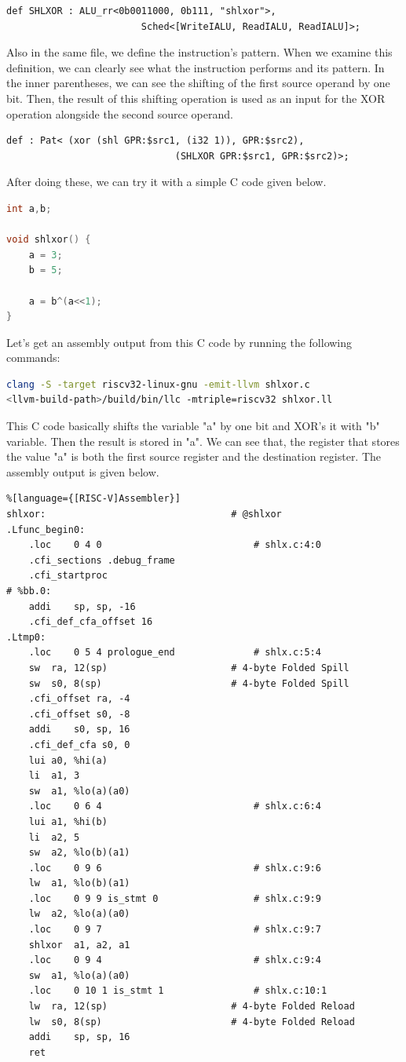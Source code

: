 \begin{lstlisting}
def SHLXOR : ALU_rr<0b0011000, 0b111, "shlxor">,
                        Sched<[WriteIALU, ReadIALU, ReadIALU]>;
\end{lstlisting}

Also in the same file, we define the instruction’s pattern. When we examine this definition, we can clearly see what the instruction performs and its pattern. In the inner parentheses, we can see the shifting of the first source operand by one bit. Then, the result of this shifting operation is used as an input for the XOR operation alongside the second source operand.

\begin{lstlisting}
def : Pat< (xor (shl GPR:$src1, (i32 1)), GPR:$src2),
                              (SHLXOR GPR:$src1, GPR:$src2)>;
\end{lstlisting}

After doing these, we can try it with a simple C code given below. 

\begin{lstlisting}[language=C++]
int a,b;

void shlxor() {
	a = 3;
	b = 5;
		
	a = b^(a<<1);
}
\end{lstlisting}

Let’s get an assembly output from this C code by running the following commands:

\begin{lstlisting}[language=Bash]
clang -S -target riscv32-linux-gnu -emit-llvm shlxor.c
<llvm-build-path>/build/bin/llc -mtriple=riscv32 shlxor.ll
\end{lstlisting}


This C code basically shifts the variable "a" by one bit and XOR’s it with "b" variable. Then the result is stored in "a". We can see that, the register that stores the value "a" is both the first source register and the destination register. The assembly output is given below.
\begin{lstlisting}%[language={[RISC-V]Assembler}]
shlxor:                                 # @shlxor
.Lfunc_begin0:
	.loc	0 4 0                           # shlx.c:4:0
	.cfi_sections .debug_frame
	.cfi_startproc
# %bb.0:
	addi	sp, sp, -16
	.cfi_def_cfa_offset 16
.Ltmp0:
	.loc	0 5 4 prologue_end              # shlx.c:5:4
	sw	ra, 12(sp)                      # 4-byte Folded Spill
	sw	s0, 8(sp)                       # 4-byte Folded Spill
	.cfi_offset ra, -4
	.cfi_offset s0, -8
	addi	s0, sp, 16
	.cfi_def_cfa s0, 0
	lui	a0, %hi(a)
	li	a1, 3
	sw	a1, %lo(a)(a0)
	.loc	0 6 4                           # shlx.c:6:4
	lui	a1, %hi(b)
	li	a2, 5
	sw	a2, %lo(b)(a1)
	.loc	0 9 6                           # shlx.c:9:6
	lw	a1, %lo(b)(a1)
	.loc	0 9 9 is_stmt 0                 # shlx.c:9:9
	lw	a2, %lo(a)(a0)
	.loc	0 9 7                           # shlx.c:9:7
	shlxor	a1, a2, a1
	.loc	0 9 4                           # shlx.c:9:4
	sw	a1, %lo(a)(a0)
	.loc	0 10 1 is_stmt 1                # shlx.c:10:1
	lw	ra, 12(sp)                      # 4-byte Folded Reload
	lw	s0, 8(sp)                       # 4-byte Folded Reload
	addi	sp, sp, 16
	ret
\end{lstlisting}

